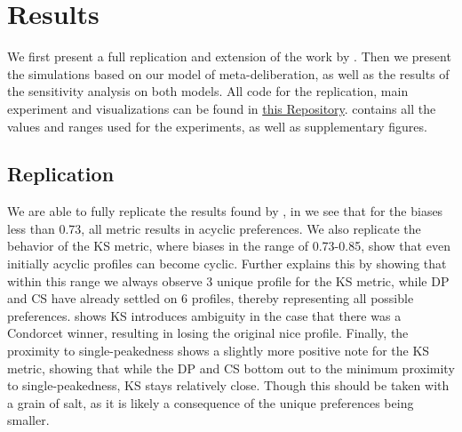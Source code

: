 \newpage
\chapter{Results}
\label{experiment_results}
We first present a full replication and extension of the work by
\citet{radDeliberationSinglePeakednessCoherent2021}. Then we present the simulations based on our model of
meta-deliberation, as well as the results of the sensitivity analysis on both
models. All code for the replication, main experiment and visualizations can be
found in \href{https://github.com/amirsahrani/master_thesis}{this Repository}.  contains all the values and ranges used for the experiments, as well as supplementary figures.


\section{Replication}\label{sec: replication} We are able to fully replicate the results found by
\citet{radDeliberationSinglePeakednessCoherent2021},  in 
we see that for the biases less than 0.73, all metric results in acyclic
preferences. We also replicate the behavior of the KS metric, where biases in
the range of 0.73-0.85, show that even initially acyclic profiles can become
cyclic.  Further explains this by showing that within this
range we always observe 3 unique profile for the KS metric, while DP and CS
have already settled on 6 profiles, thereby representing all possible
preferences.  shows KS introduces ambiguity in the case
that there was a Condorcet winner, resulting in losing the original nice
profile. Finally, the proximity to single-peakedness shows a slightly more
positive note for the KS metric, showing that while the DP and CS bottom out to
the minimum proximity to single-peakedness, KS stays relatively close. Though
this should be taken with a grain of salt, as it is likely a consequence of the
unique preferences being smaller.

